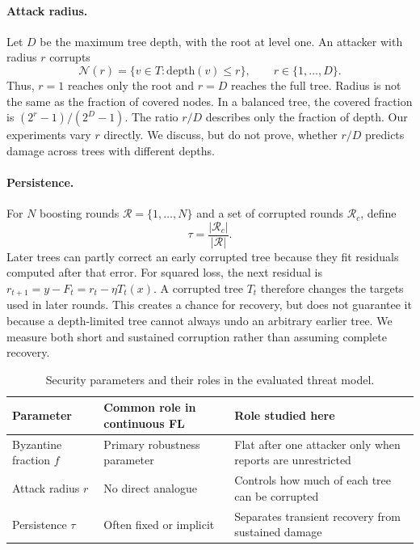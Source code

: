 \documentclass[11pt]{article}
\begin{document}
\paragraph{Attack radius.}
Let $D$ be the maximum tree depth, with the root at level one. An attacker with radius $r$ corrupts
\begin{equation}
\mathcal{N}(r)=\{v\in T:\mathrm{depth}(v)\leq r\},
\qquad r\in\{1,\ldots,D\}.
\label{eq:rdef}
\end{equation}
Thus, $r=1$ reaches only the root and $r=D$ reaches the full tree. Radius is not the same as the fraction of covered nodes. In a balanced tree, the covered fraction is $(2^r-1)/(2^D-1)$. The ratio $r/D$ describes only the fraction of depth. Our experiments vary $r$ directly. We discuss, but do not prove, whether $r/D$ predicts damage across trees with different depths.

\paragraph{Persistence.}
For $N$ boosting rounds $\mathcal{R}=\{1,\ldots,N\}$ and a set of corrupted rounds $\mathcal{R}_c$, define
\begin{equation}
\tau=\frac{\lvert\mathcal{R}_c\rvert}{\lvert\mathcal{R}\rvert}.
\label{eq:taudef}
\end{equation}
Later trees can partly correct an early corrupted tree because they fit residuals computed after that error. For squared loss, the next residual is $r_{t+1}=y-F_t=r_t-\eta T_t(x)$. A corrupted tree $T_t$ therefore changes the targets used in later rounds. This creates a chance for recovery, but does not guarantee it because a depth-limited tree cannot always undo an arbitrary earlier tree. We measure both short and sustained corruption rather than assuming complete recovery.

\begin{table}[htbp]
\centering
\caption{Security parameters and their roles in the evaluated threat model.}
\begin{tabular}{p{3.0cm}p{4.5cm}p{5.4cm}}
\toprule
Parameter & Common role in continuous FL & Role studied here \\
\midrule
Byzantine fraction $f$ & Primary robustness parameter & Flat after one attacker only when reports are unrestricted \\
Attack radius $r$ & No direct analogue & Controls how much of each tree can be corrupted \\
Persistence $\tau$ & Often fixed or implicit & Separates transient recovery from sustained damage \\
\bottomrule
\end{tabular}
\label{tab:parameters}
\end{table}
\end{document}
